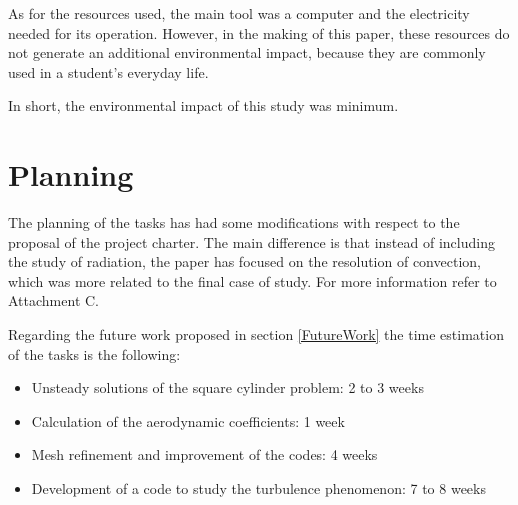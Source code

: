 As for the resources used, the main tool was a computer and the electricity needed for its operation. However, in the making of this paper, these resources do not generate an additional environmental impact, because they are commonly used in a student's everyday life.

In short, the environmental impact of this study was minimum.

\section{Planning}
The planning of the tasks has had some modifications with respect to the proposal of the project charter. The main difference is that instead of including the study of radiation, the paper has focused on the resolution of convection, which was more related to the final case of study. For more information refer to Attachment C.

Regarding the future work proposed in section \ref{FutureWork} the time estimation of the tasks is the following:
\begin{itemize}
	\item Unsteady solutions of the square cylinder problem: 2 to 3 weeks
	\item Calculation of the aerodynamic coefficients: 1 week
	\item Mesh refinement and improvement of the codes: 4 weeks
	\item Development of a code to study the turbulence phenomenon: 7 to 8 weeks
\end{itemize}